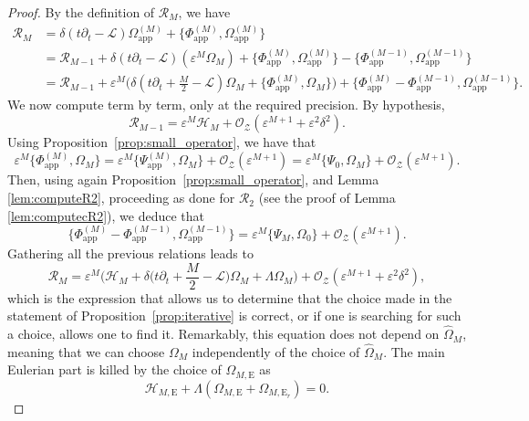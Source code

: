 \documentclass[11pt,reqno,a4paper]{amsart}
\def\eps{\varepsilon}
\def\de{{\partial}}
\newcommand{\cH}{\mathcal{H}}
\newcommand{\cL}{\mathcal{L}}
\newcommand{\cO}{\mathcal{O}}
\newcommand{\cR}{\mathcal{R}}
\newcommand{\cZ}{\mathcal{Z}}
\newcommand{\1}{\mathbbm{1}}
\theoremstyle{definition}
\theoremstyle{definition}
\numberwithin{equation}{section}
\newcommand{\Mapp}[2]{#1^{(#2)}_\mathrm{app}}
\begin{document}
\begin{proof}
By the definition of $\cR_M$, we have
    \begin{align}
        \cR_{M} & =\delta(t\de_t-\cL)\Mapp{\Omega}{M}+\{\Mapp{\Phi}{M},\Mapp{\Omega}{M}\} \\
        & = \cR_{M-1} + \delta(t\de_t-\cL) (\eps^{M}\Omega_{M}) + \{\Mapp{\Phi}{M},\Mapp{\Omega}{M}\} - \{\Mapp{\Phi}{M-1},\Mapp{\Omega}{M-1}\} \\
        & = \cR_{M-1} + \eps^{M}\Big(\delta(t\de_t+\frac{M}{2}-\cL) \Omega_{M} + \{\Mapp{\Phi}{M},\Omega_{M}\}\Big) + \{\Mapp{\Phi}{M}-\Mapp{\Phi}{M-1},\Mapp{\Omega}{M-1}\}.
    \end{align}
    We now compute term by term, only at the required precision. By hypothesis, \begin{equation}
        \cR_{M-1} = \eps^{M} \cH_{M} +\cO_\cZ(\eps^{M+1} + \eps^2\delta^2).
    \end{equation} 
    Using Proposition~\ref{prop:small_operator}, we have that 
    \begin{equation}
        \eps^{M} \{\Mapp{\Phi}{M},\Omega_{M}\} = \eps^{M} \{ \Mapp{\Psi}{M} , \Omega_{M} \} + \cO_\cZ(\eps^{M+1}) = \eps^{M} \{ \Psi_0 , \Omega_{M} \} + \cO_\cZ(\eps^{M+1}).
    \end{equation}
    Then, using again Proposition~\ref{prop:small_operator}, and Lemma \ref{lem:computeR2}, proceeding as done for $\cR_2$ (see the proof of Lemma \ref{lem:computecR2}), we deduce that 
    \begin{equation}
         \{\Mapp{\Phi}{M}-\Mapp{\Phi}{M-1},\Mapp{\Omega}{M-1}\}=\eps^{M}\{\Psi_M,\Omega_0\}+\cO_{\cZ}(\eps^{M+1}).
    \end{equation}
    Gathering all the previous relations leads to
    \begin{equation}
        \cR_{M} = \eps^{M} \Big( \cH_{M} + \delta \Big(t\partial_t + \frac{M}{2}- \cL\Big)\Omega_{M} + \Lambda \Omega_{M}\Big) + \cO_{\cZ}(\eps^{M+1}+\eps^2\delta^2),
    \end{equation}
    which is the expression that allows us to determine that the choice made in the statement of Proposition~\ref{prop:iterative} is correct, or if one is searching for such a choice, allows one to find it. Remarkably, this equation does not depend on $\widehat{\Omega}_{M}$, meaning that we can choose $\Omega_{M}$ independently of the choice of $\widehat{\Omega}_{M}$. The main Eulerian part is killed by the choice of $\Omega_{M,\mathrm{E}}$ as
    \begin{equation}
        \cH_{M,\mathrm{E}} + \Lambda (\Omega_{M,\mathrm{E}}+\Omega_{M,\mathrm{E}_r}) = 0.

\end{equation}
\end{proof}
\end{document}
